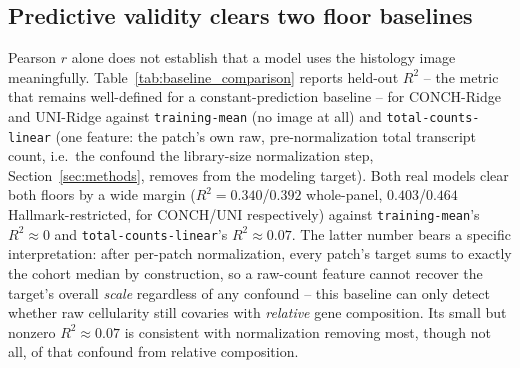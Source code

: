 \documentclass[11pt]{article}
\begin{document}


\subsection{Predictive validity clears two floor baselines}
\label{sec:baselines}
Pearson $r$ alone does not establish that a model uses the histology image meaningfully. Table~\ref{tab:baseline_comparison} reports held-out $R^2$ -- the metric that remains well-defined for a constant-prediction baseline -- for CONCH-Ridge and UNI-Ridge against \texttt{training-mean} (no image at all) and \texttt{total-counts-linear} (one feature: the patch's own raw, pre-normalization total transcript count, i.e.\ the confound the library-size normalization step, Section~\ref{sec:methods}, removes from the modeling target). Both real models clear both floors by a wide margin ($R^2=0.340$/$0.392$ whole-panel, $0.403$/$0.464$ Hallmark-restricted, for CONCH/UNI respectively) against \texttt{training-mean}'s $R^2\approx0$ and \texttt{total-counts-linear}'s $R^2\approx0.07$. The latter number bears a specific interpretation: after per-patch normalization, every patch's target sums to exactly the cohort median by construction, so a raw-count feature cannot recover the target's overall \emph{scale} regardless of any confound -- this baseline can only detect whether raw cellularity still covaries with \emph{relative} gene composition. Its small but nonzero $R^2\approx0.07$ is consistent with normalization removing most, though not all, of that confound from relative composition.


\end{document}
